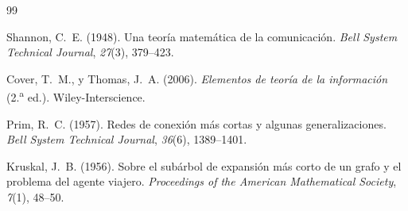 \documentclass[12pt, a4paper]{article}
\begin{document}
\begin{thebibliography}{99}

Shannon, C.~E. (1948).
Una teoría matemática de la comunicación.
\textit{Bell System Technical Journal}, \textit{27}(3), 379--423.

Cover, T.~M., y Thomas, J.~A. (2006).
\textit{Elementos de teoría de la información} (2.\textsuperscript{a} ed.).
Wiley-Interscience.

Prim, R.~C. (1957).
Redes de conexión más cortas y algunas generalizaciones.
\textit{Bell System Technical Journal}, \textit{36}(6), 1389--1401.

Kruskal, J.~B. (1956).
Sobre el subárbol de expansión más corto de un grafo y el problema del
agente viajero.
\textit{Proceedings of the American Mathematical Society},
\textit{7}(1), 48--50.

\end{thebibliography}

\end{document}
